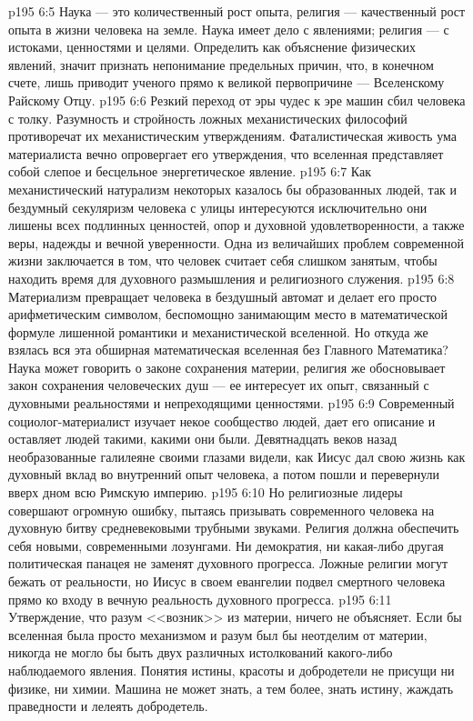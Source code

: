 \vs p195 6:5 Наука --- это количественный рост опыта, религия --- качественный рост опыта в жизни человека на земле. Наука имеет дело с явлениями; религия --- с истоками, ценностями и целями. Определить  как объяснение физических явлений, значит признать непонимание предельных причин, что, в конечном счете, лишь приводит ученого прямо к великой первопричине --- Вселенскому Райскому Отцу.
\vs p195 6:6 Резкий переход от эры чудес к эре машин сбил человека с толку. Разумность и стройность ложных механистических философий противоречат их механистическим утверждениям. Фаталистическая живость ума материалиста вечно опровергает его утверждения, что вселенная представляет собой слепое и бесцельное энергетическое явление.
\vs p195 6:7 Как механистический натурализм некоторых казалось бы образованных людей, так и бездумный секуляризм человека с улицы интересуются исключительно  они лишены всех подлинных ценностей, опор и духовной удовлетворенности, а также веры, надежды и вечной уверенности. Одна из величайших проблем современной жизни заключается в том, что человек считает себя слишком занятым, чтобы находить время для духовного размышления и религиозного служения.
\vs p195 6:8 Материализм превращает человека в бездушный автомат и делает его просто арифметическим символом, беспомощно занимающим место в математической формуле лишенной романтики и механистической вселенной. Но откуда же взялась вся эта обширная математическая вселенная без Главного Математика? Наука может говорить о законе сохранения материи, религия же обосновывает закон сохранения человеческих душ --- ее интересует их опыт, связанный с духовными реальностями и непреходящими ценностями.
\vs p195 6:9 Современный социолог\hyp{}материалист изучает некое сообщество людей, дает его описание и оставляет людей такими, какими они были. Девятнадцать веков назад необразованные галилеяне своими глазами видели, как Иисус дал свою жизнь как духовный вклад во внутренний опыт человека, а потом пошли и перевернули вверх дном всю Римскую империю.
\vs p195 6:10 Но религиозные лидеры совершают огромную ошибку, пытаясь призывать современного человека на духовную битву средневековыми трубными звуками. Религия должна обеспечить себя новыми, современными лозунгами. Ни демократия, ни какая\hyp{}либо другая политическая панацея не заменят духовного прогресса. Ложные религии могут бежать от реальности, но Иисус в своем евангелии подвел смертного человека прямо ко входу в вечную реальность духовного прогресса.
\vs p195 6:11 Утверждение, что разум <<возник>> из материи, ничего не объясняет. Если бы вселенная была просто механизмом и разум был бы неотделим от материи, никогда не могло бы быть двух различных истолкований какого\hyp{}либо наблюдаемого явления. Понятия истины, красоты и добродетели не присущи ни физике, ни химии. Машина не может знать, а тем более, знать истину, жаждать праведности и лелеять добродетель.
